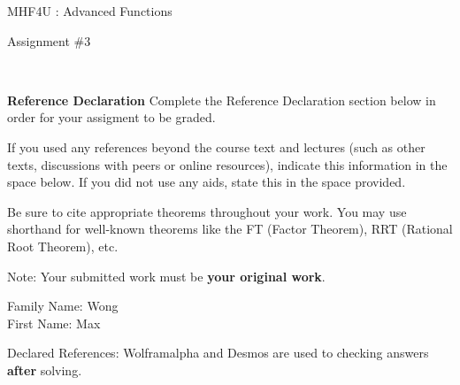 \documentclass[12pt]{book}
\begin{document}
\vspace{-1.0in}\begin{center}
\Large{MHF4U :  Advanced Functions }

\Large{Assignment \#3}


\end{center}


\vspace{0.015in}\hrulefill\ 

\textbf{Reference Declaration} %
Complete the Reference Declaration section below in order for your assigment to be graded.

If you used any references beyond the course text and lectures (such as other texts, discussions with peers or online resources), indicate this information in the space below.  If you did not use any aids, state this in the space provided. 

Be sure to cite appropriate theorems throughout your work. You may use shorthand for well-known theorems like the FT (Factor Theorem), RRT (Rational Root Theorem), etc. 

Note: Your submitted work must be \textbf{your original work}. 

Family Name: Wong\\%
First Name: Max%

Declared References: 
Wolframalpha and Desmos are used to checking answers \textbf{after} solving.


\vspace{0.015in}\hrulefill\ 

\newpage

\end{document}
